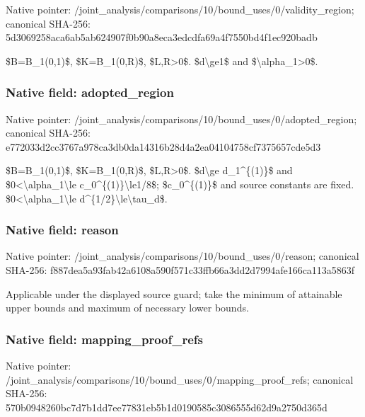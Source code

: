 \documentclass[10pt,a4paper]{article}
\begin{document}
Native pointer: /joint\_analysis/comparis\allowbreak{}ons/10/bound\_uses/0/vali\allowbreak{}dity\_region; canonical SHA-256: 5d3069258aca6ab5ab624907\allowbreak{}f0b90a8eca3edcdfa69a4f75\allowbreak{}50bd4f1ec920badb


\$B=B\_1(0,1)\$, \$K=B\_1(0,R)\$, \$L,R>0\$. \$d\textbackslash{}ge1\$ and \$\textbackslash{}alpha\_1>0\$.


\subsubsection{Native field: adopted\_region}


Native pointer: /joint\_analysis/comparis\allowbreak{}ons/10/bound\_uses/0/adop\allowbreak{}ted\_region; canonical SHA-256: e772033d2cc3767a978ca3db\allowbreak{}0da14316b28d4a2ea0410475\allowbreak{}8cf7375657cde5d3


\$B=B\_1(0,1)\$, \$K=B\_1(0,R)\$, \$L,R>0\$. \$d\textbackslash{}ge d\_1\textasciicircum{}\{(1)\}\$ and \$0<\textbackslash{}alpha\_1\textbackslash{}le c\_0\textasciicircum{}\{(1)\}\textbackslash{}le1/8\$; \$c\_0\textasciicircum{}\{(1)\}\$ and source constants are fixed. \$0<\textbackslash{}alpha\_1\textbackslash{}le d\textasciicircum{}\{1/2\}\textbackslash{}le\textbackslash{}tau\_d\$.


\subsubsection{Native field: reason}


Native pointer: /joint\_analysis/comparis\allowbreak{}ons/10/bound\_uses/0/reas\allowbreak{}on; canonical SHA-256: f887dea5a93fab42a6108a59\allowbreak{}0f571c33ffb66a3dd2d7994a\allowbreak{}fe166ca113a5863f


Applicable under the displayed source guard; take the minimum of attainable upper bounds and maximum of necessary lower bounds.


\subsubsection{Native field: mapping\_proof\_refs}


Native pointer: /joint\_analysis/comparis\allowbreak{}ons/10/bound\_uses/0/mapp\allowbreak{}ing\_proof\_refs; canonical SHA-256: 570b0948260bc7d7b1dd7ee7\allowbreak{}7831eb5b1d0190585c308655\allowbreak{}5d62d9a2750d365d
\end{document}
